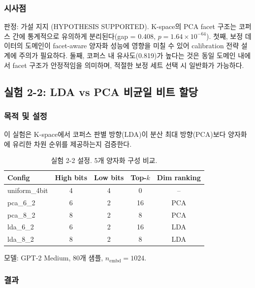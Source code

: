 \documentclass[11pt,a4paper]{article}
\begin{document}
\subsubsection{시사점}

판정: \textcolor{success}{가설 지지 (HYPOTHESIS SUPPORTED)}.
K-space의 PCA facet 구조는 코퍼스 간에 통계적으로 유의하게 분리된다(gap = 0.408, $p = 1.64 \times 10^{-64}$).
첫째, 보정 데이터의 도메인이 facet-aware 양자화 성능에 영향을 미칠 수 있어 calibration 전략 설계에 주의가 필요하다.
둘째, 코퍼스 내 유사도(0.819)가 높다는 것은 동일 도메인 내에서 facet 구조가 안정적임을 의미하며, 적절한 보정 세트 선택 시 일반화가 가능하다.

\subsection{실험 2-2: LDA vs PCA 비균일 비트 할당}

\subsubsection{목적 및 설정}

이 실험은 K-space에서 코퍼스 판별 방향(LDA)이 분산 최대 방향(PCA)보다 양자화에 유리한 차원 순위를 제공하는지 검증한다.

\begin{table}[H]
\centering
\caption{실험 2-2 설정. 5개 양자화 구성 비교.}
\label{tab:exp22_setup}
\begin{tabular}{lcccc}
\toprule
\textbf{Config} & \textbf{High bits} & \textbf{Low bits} & \textbf{Top-$k$} & \textbf{Dim ranking} \\
\midrule
uniform\_4bit & 4 & 4 & 0 & -- \\
pca\_6\_2 & 6 & 2 & 16 & PCA \\
pca\_8\_2 & 8 & 2 & 8 & PCA \\
lda\_6\_2 & 6 & 2 & 16 & LDA \\
lda\_8\_2 & 8 & 2 & 8 & LDA \\
\bottomrule
\end{tabular}
\end{table}

모델: GPT-2 Medium, 80개 샘플, $n_\mathrm{embd} = 1024$.

\subsubsection{결과}
\end{document}
